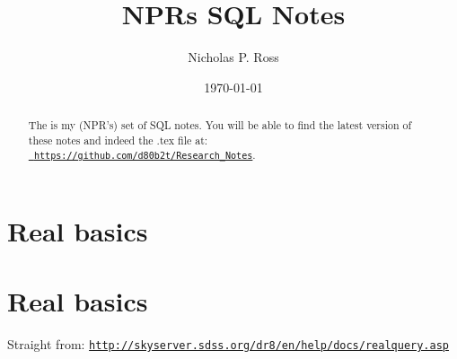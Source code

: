 \documentclass[11pt,a4paper]{article}
\begin{document}
\title{NPRs SQL Notes}
\author{Nicholas P. Ross}
\date{\today}
\maketitle




\begin{abstract}
The is my (NPR's) set of SQL notes.  
You will be able to find the latest version of these notes
and indeed the .tex file at:\\
\href{https://github.com/d80b2t/Research\_Notes}{\tt
https://github.com/d80b2t/Research\_Notes}.
\end{abstract}


\newpage
\tableofcontents


\newpage
\section{Real basics}


\newpage
\section{Real basics}
Straight from: \href{http://skyserver.sdss.org/dr8/en/help/docs/realquery.asp}{\tt http://skyserver.sdss.org/dr8/en/help/docs/realquery.asp}
\end{document}
